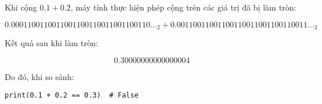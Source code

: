 \documentclass{article}
\begin{document}
Khi cộng \(0.1 + 0.2\), máy tính thực hiện phép cộng trên các giá trị đã bị làm tròn:

\[
0.0001100110011001100110011001100110..._2 + 0.00110011001100110011001100110011..._2
\]

Kết quả sau khi làm tròn:

\[
0.30000000000000004
\]

Do đó, khi so sánh:

\begin{verbatim}
print(0.1 + 0.2 == 0.3)  # False
\end{verbatim}



\section{}
\end{document}
